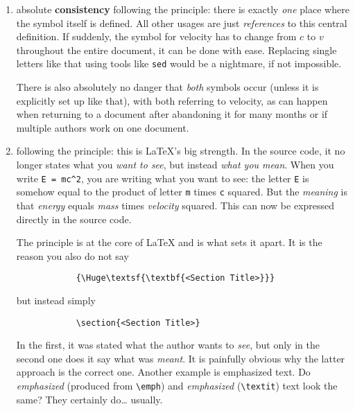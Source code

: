 \begin{enumerate}
    \item absolute \textbf{consistency} following the 
          principle:
          there is exactly \emph{one} place where the symbol itself is defined.
          All other usages are just \emph{references} to this central definition.
          If suddenly, the symbol for velocity has to change from \(c\) to \(v\)
          throughout the entire document, it can be done with ease.
          Replacing single letters like that using tools like \texttt{sed} would be a
          nightmare, if not impossible.
          
          There is also absolutely no danger that \emph{both} symbols occur (unless
          it is explicitly set up like that), with both referring to velocity,
          as can happen when returning to a document after abandoning it for many months
          or if multiple authors work on one document.
    \item following the \textbf{} principle:
          this is \LaTeX{}'s big strength.
          In the source code, it no longer states what you \emph{want to see}, but
          instead \emph{what you mean}.
          When you write \verb|E = mc^2|, you are writing what you want to see:
          the letter \texttt{E} is somehow equal to the product of letter \texttt{m}
          times \texttt{c} squared.
          But the \emph{meaning} is that \emph{energy} equals \emph{mass} times
          \emph{velocity} squared.
          This can now be expressed directly in the source code.
          
          The  principle is at the core of \LaTeX{}
          and is what sets it apart.
          It is the reason you also do not say
          \begin{verbatim}
            {\Huge\textsf{\textbf{<Section Title>}}}
        \end{verbatim}
          but instead simply
          \begin{verbatim}
            \section{<Section Title>}
        \end{verbatim}
          In the first, it was stated what the author wants to \emph{see}, but only
          in the second one does it say what was \emph{meant}.
          It is painfully obvious why the latter approach is the correct one.
          Another example is emphasized text.
          Do \emph{emphasized} (produced from \verb|\emph|) and \textit{emphasized}
          (\verb|\textit|) text look the same?
          They certainly do\dots{} usually.
          

\end{enumerate}
